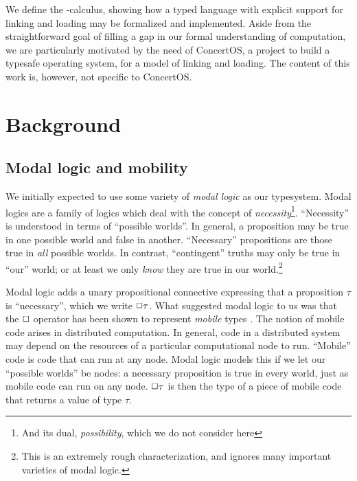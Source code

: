\documentclass[11pt]{article}
\begin{document}
We define the \llib{}-calculus, showing how a typed language with explicit
support for linking and loading may be formalized and implemented.
Aside from the straightforward goal of filling a gap in our formal understanding
of computation, we are particularly motivated by the need of ConcertOS, a
project to build a typesafe operating system, for a model of linking and
loading. The content of this work is, however, not specific to ConcertOS.



%
%


\section{Background}

\subsection{Modal logic and mobility}

We initially expected to use some variety of \emph{modal logic} as our
typesystem. Modal logics are a family of logics which deal with the concept of
\emph{necessity}\footnote{And its dual, \emph{possibility}, which we do not
  consider here}. ``Necessity'' is understood in terms of ``possible worlds''.
In general, a proposition may be true in one possible world and false in
another. ``Necessary'' propositions are those true in \emph{all} possible
worlds. In contrast, ``contingent'' truths may only be true in ``our'' world; or
at least we only \emph{know} they are true in our world.\footnote{This is an
  extremely rough characterization, and ignores many important varieties of
  modal logic.}


Modal logic adds a unary propositional connective expressing that a proposition
$\tau$ is ``necessary'', which we write $\Box \tau$. What suggested modal logic
to us was that the $\Box$ operator has been shown to represent \emph{mobile}
types \cite{murphy2008modal}. The notion of mobile code arises in distributed
computation. In general, code in a distributed system may depend on the
resources of a particular computational node to run. ``Mobile'' code is code
that can run at any node. Modal logic models this if we let our ``possible
worlds'' be nodes: a necessary proposition is true in every world, just as
mobile code can run on any node. $\Box \tau$ is then the type of a piece of
mobile code that returns a value of type $\tau$.
\end{document}
